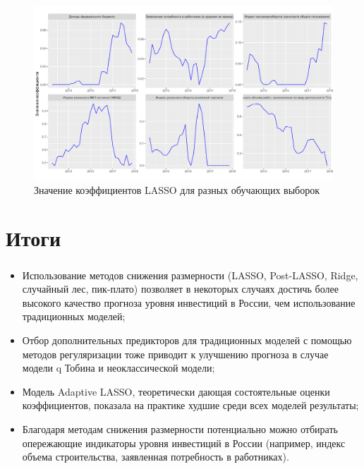 \documentclass[c, dvipsnames]{beamer}  %
\begin{document}
\begin{frame}
\frametitle{\insertsection} 
\framesubtitle{\insertsubsection}
\begin{figure}
\caption{Значение коэффициентов LASSO для разных обучающих выборок}
\includegraphics[width=\linewidth]{coef_plot.pdf}
\end{figure}
\end{frame} 

\section{Итоги}
\begin{frame}
\frametitle{\insertsection} 
\framesubtitle{\insertsubsection} 
\begin{itemize}
    \item  Использование методов снижения размерности (LASSO, Post-LASSO, Ridge, случайный лес, пик-плато) позволяет в некоторых случаях достичь более высокого качество прогноза уровня инвестиций в России, чем использование традиционных моделей;
    \item Отбор дополнительных предикторов для традиционных моделей с помощью методов регуляризации тоже приводит к улучшению прогноза в случае модели q Тобина и неоклассической модели;
    \item Модель Adaptive LASSO, теоретически дающая состоятельные оценки коэффициентов, показала на практике худшие среди всех моделей результаты;
    \item Благодаря методам снижения размерности потенциально можно отбирать опережающие индикаторы уровня инвестиций в России (например, индекс объема строительства, заявленная потребность в работниках). 
\end{itemize}
   
    
\end{frame}
\end{document}
